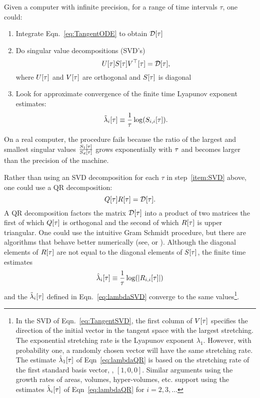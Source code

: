Given a computer with infinite precision, for a range of time
intervals $\tau$, one could:
\begin{enumerate}
\item Integrate Eqn.~\eqref{eq:TangentODE} to obtain $\ti{\DM}{\ct}$
\item \label{item:SVD} Do singular value decompositions (SVD's)
  \begin{equation}
    \label{eq:TangentSVD}
    \ti{U}{\ct} \ti{S}{\ct} \ti{V\transpose}{\ct} = \ti{\DM}{\ct},
  \end{equation}
  where ${U}{[\tau]}$ and ${V}{[\tau]}$ are orthogonal and ${S}{[\tau]}$ is
  diagonal
\item Look for approximate convergence of the finite time Lyapunov
  exponent estimates:
  \begin{equation}
    \label{eq:lambdaSVD}
    {\tilde \lambda_i}{[\tau]} \equiv \frac{1}{\tau} \log( {S_{i,i}}{[\tau]} ) .
  \end{equation}
\end{enumerate}
On a real computer, the procedure fails because the ratio of the
largest and smallest singular values
$\frac{{S_1}{[\tau]}}{{S_d}{[\tau]}}$ grows exponentially with $\tau$
and becomes larger than the precision of the machine.

Rather than using an SVD decomposition for each $\tau$ in
step~\ref{item:SVD} above, one could use a QR decomposition:
\begin{equation}
  \label{eq:TangentQR}
  \ti{Q}{\ct} \ti{R}{\ct} = \ti{\DM}{\ct}.
\end{equation}
A QR decomposition factors the matrix $\ti{\DM}{\ct}$ into a product
of two matrices the first of which ${Q}{[\tau]}$ is orthogonal and the
second of which ${R}{[\tau]}$ is upper triangular.  One could use the
intuitive Gram Schmidt procedure, but there are algorithms that behave
better numerically (see, \eg \cite{GandL3} or \cite{Press92}).
Although the diagonal elements of ${R}{[\tau]}$ are not equal to the
diagonal elements of ${S}{[\tau]}$, the finite time estimates
\begin{equation}
  \label{eq:lambdaQR}
  {\hat \lambda_i}{[\tau]} \equiv \frac{1}{\tau} \log( \left|
  {R_{i,i}}{[\tau]} \right| )
\end{equation}
and the ${\tilde \lambda_i}{[\tau]}$ defined in
Eqn.~\eqref{eq:lambdaSVD} converge to the same values\footnote{In the
  SVD of Eqn.~\eqref{eq:TangentSVD}, the first column of ${V}{[\tau]}$
  specifies the direction of the initial vector in the tangent space
  with the largest stretching.  The exponential stretching rate is the
  Lyapunov exponent $\lambda_1$.  However, with probability one, a
  randomly chosen vector will have the same stretching rate.  The
  estimate ${\hat \lambda_1}{[\tau]}$ of Eqn~\eqref{eq:lambdaQR} is
  based on the stretching rate of the first standard basis vector, \ie,
  $[1,0,0]$.
  Similar arguments using the growth rates of areas, volumes,
  hyper-volumes, etc. support using the estimates ${\hat
    \lambda_i}{[\tau]}$ of Eqn~\eqref{eq:lambdaQR} for $i=2,3,\ldots$}.

